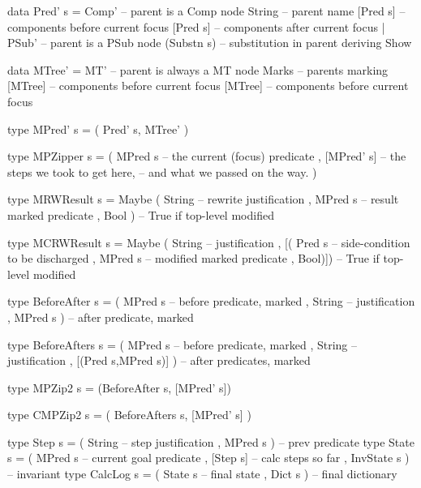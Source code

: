 \begin{code}
data Pred' s
 = Comp'        -- parent is a Comp node
     String       -- parent name
     [Pred s]     -- components before current focus
     [Pred s]     -- components after current focus
 | PSub'        -- parent is a PSub node
     (Substn s)   -- substitution in parent
 deriving Show

data MTree'
 = MT'       -- parent is always a MT node
     Marks     -- parents marking
     [MTree]   -- components before current focus
     [MTree]   -- components before current focus

type MPred' s = ( Pred' s, MTree' )

type MPZipper s
  = ( MPred s    -- the current (focus) predicate
    , [MPred' s] -- the steps we took to get here,
                   -- and what we passed on the way.
    )
\end{code}

\newpage
\begin{code}
type MRWResult s
 = Maybe ( String  -- rewrite justification
         , MPred s  -- result marked predicate
         , Bool )  -- True if top-level modified

type MCRWResult s
 = Maybe ( String      -- justification
         , [( Pred s   -- side-condition to be discharged
            , MPred s   -- modified marked predicate
            , Bool)])  -- True if top-level modified
\end{code}


\begin{code}
type BeforeAfter s
 = ( MPred s   -- before predicate, marked
   , String      -- justification
   , MPred s ) -- after predicate, marked
\end{code}

\begin{code}
type BeforeAfters s
 = ( MPred s   -- before predicate, marked
   , String      -- justification
   , [(Pred s,MPred s)] ) -- after predicates, marked
\end{code}

\begin{code}
type MPZip2 s = (BeforeAfter s, [MPred' s])
\end{code}

\begin{code}
type CMPZip2 s = ( BeforeAfters s, [MPred' s] )
\end{code}

\begin{code}
type Step s
 = ( String        -- step justification
   , MPred s )     -- prev predicate
type State s
 = ( MPred s       -- current goal predicate
   , [Step s]      -- calc steps so far
   , InvState s )  -- invariant
type CalcLog s = ( State s   -- final state
                 , Dict s )  -- final dictionary
\end{code}

